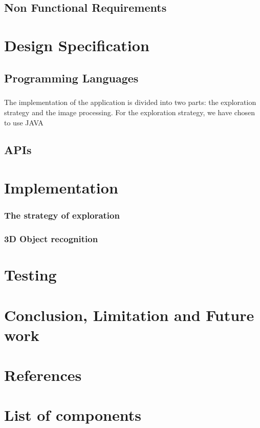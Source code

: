 \documentclass[12pt]{report}
\begin{document}
\section{Non Functional Requirements}
\chapter{Design Specification}
\section{Programming Languages}
\paragraph{}
The implementation of the application is divided into two parts: the exploration strategy and the image processing. For the exploration strategy, we have chosen to use JAVA
\section{APIs}
\paragraph{}

\chapter{Implementation}
\subsection{The strategy of exploration}
\subsection{3D Object recognition}

\chapter{Testing}
\chapter{Conclusion, Limitation and Future work}
\chapter{References}
\appendix
\chapter{List of components}
\end{document}
